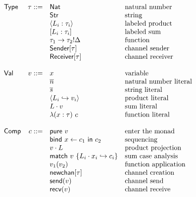 \documentclass[12pt]{article}
\begin{document}
\[
\begin{array}{l r l l}
\textsf{Type}   &   \tau ::= & \textsf{Nat}                      & \text{natural number} \\
                &            & \textsf{Str}                      & \text{string} \\
                &            & \langle L_i : \tau_i \rangle      & \text{labeled product} \\
                &            & [ L_i : \tau_i ]                  & \text{labeled sum} \\
                &            & \tau_1 \rightarrow \tau_2!\Delta  & \text{function} \\
                &            & \textsf{Sender}[\tau]             & \text{channel sender} \\
                &            & \textsf{Receiver}[\tau]           & \text{channel receiver} \\
\\
\textsf{Val}    &      v ::= & x                                 & \text{variable} \\
                &            & \overline{n}                      & \text{natural number literal} \\
                &            & \overline{s}                      & \text{string literal} \\
                &            & \langle
                               L_i \hookrightarrow v_i
                               \rangle                           & \text{product literal} \\
                &            & L \cdot v                         & \text{sum literal} \\
                &            & \lambda (x : \tau) \ c            & \text{function literal} \\
\\
\textsf{Comp}   &      c ::= & \textsf{pure} \ v                 & \text{enter the monad} \\
                &            & \textsf{bind} \ x \leftarrow c_1
                               \ \textsf{in} \ c_2               & \text{sequencing} \\
                &            & v \cdot L                         & \text{product projection} \\
                &            & \textsf{match} \ v \ \{
                               L_i \cdot x_i \hookrightarrow c_i
                               \}                                & \text{sum case analysis} \\
                &            & v_1 (v_2)                         & \text{function application} \\
                &            & \textsf{newchan}[\tau]            & \text{channel creation} \\
                &            & \textsf{send}(v)                  & \text{channel send} \\
                &            & \textsf{recv}(v)                  & \text{channel receive} \\
\end{array}
\]
\end{document}
